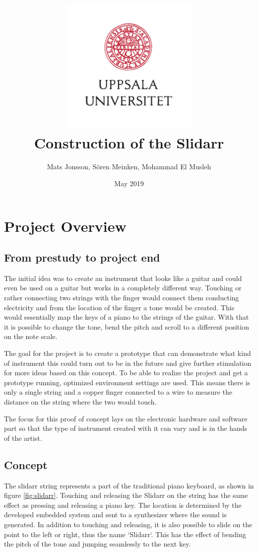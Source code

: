 \documentclass{article}
\title{\includegraphics[width=0.5\textwidth]{UU_logo.pdf}\\
Construction of the Slidarr}
\author{Mats Jonsson, Sören Meinken, Mohammad El Musleh}
\date{May 2019}
\begin{document}
\maketitle

\pagebreak

\tableofcontents

\pagebreak

\section{Project Overview}

\subsection{From prestudy to project end}
The initial idea was to create an instrument that looks like a guitar and could even be used on a guitar but works in a completely different way. Touching or rather connecting two strings with the finger would connect them conducting electricity and from the location of the finger a tone would be created. This would essentially map the keys of a piano to the strings of the guitar. With that it is possible to change the tone, bend the pitch and scroll to a different position on the note scale.

The goal for the project is to create a prototype that can demonstrate what kind of instrument this could turn out to be in the future and give further stimulation for more ideas based on this concept. To be able to realize the project and get a prototype running, optimized environment settings are used. This means there is only a single string and a copper finger connected to a wire to measure the distance on the string where the two would touch.

The focus for this proof of concept lays on the electronic hardware and software part so that the type of instrument created with it can vary and is in the hands of the artist.


\subsection{Concept}

The slidarr string represents a part of the traditional piano keyboard, as shown in figure \ref{fig:slidarr}. Touching and releasing the Slidarr on the string has the same effect as pressing and releasing a piano key. The location is determined by the developed embedded system and sent to a synthesizer where the sound is generated. In addition to touching and releasing, it is also possible to slide on the point to the left or right, thus the name `Slidarr`. This has the effect of bending the pitch of the tone and jumping seamlessly to the next key. 
\end{document}
